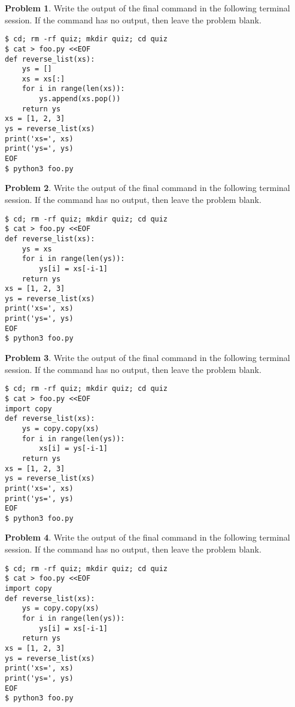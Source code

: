 \documentclass[10pt]{article}
\theoremstyle{definition}
\newtheorem{problem}{Problem}
\begin{document}
\filbreak
\begin{problem}
    Write the output of the final command in the following terminal session.
    If the command has no output, then leave the problem blank.
\end{problem}
\begin{lstlisting}
$ cd; rm -rf quiz; mkdir quiz; cd quiz
$ cat > foo.py <<EOF
def reverse_list(xs):
    ys = []
    xs = xs[:]
    for i in range(len(xs)):
        ys.append(xs.pop())
    return ys
xs = [1, 2, 3]
ys = reverse_list(xs)
print('xs=', xs)
print('ys=', ys)
EOF
$ python3 foo.py
\end{lstlisting}


\filbreak
\begin{problem}
    Write the output of the final command in the following terminal session.
    If the command has no output, then leave the problem blank.
\end{problem}
\begin{lstlisting}
$ cd; rm -rf quiz; mkdir quiz; cd quiz
$ cat > foo.py <<EOF
def reverse_list(xs):
    ys = xs
    for i in range(len(ys)):
        ys[i] = xs[-i-1]
    return ys
xs = [1, 2, 3]
ys = reverse_list(xs)
print('xs=', xs)
print('ys=', ys)
EOF
$ python3 foo.py
\end{lstlisting}

\filbreak
\begin{problem}
    Write the output of the final command in the following terminal session.
    If the command has no output, then leave the problem blank.
\end{problem}
\begin{lstlisting}
$ cd; rm -rf quiz; mkdir quiz; cd quiz
$ cat > foo.py <<EOF
import copy
def reverse_list(xs):
    ys = copy.copy(xs)
    for i in range(len(ys)):
        xs[i] = ys[-i-1]
    return ys
xs = [1, 2, 3]
ys = reverse_list(xs)
print('xs=', xs)
print('ys=', ys)
EOF
$ python3 foo.py
\end{lstlisting}


\filbreak
\begin{problem}
    Write the output of the final command in the following terminal session.
    If the command has no output, then leave the problem blank.
\end{problem}
\begin{lstlisting}
$ cd; rm -rf quiz; mkdir quiz; cd quiz
$ cat > foo.py <<EOF
import copy
def reverse_list(xs):
    ys = copy.copy(xs)
    for i in range(len(ys)):
        ys[i] = xs[-i-1]
    return ys
xs = [1, 2, 3]
ys = reverse_list(xs)
print('xs=', xs)
print('ys=', ys)
EOF
$ python3 foo.py
\end{lstlisting}
\end{document}

